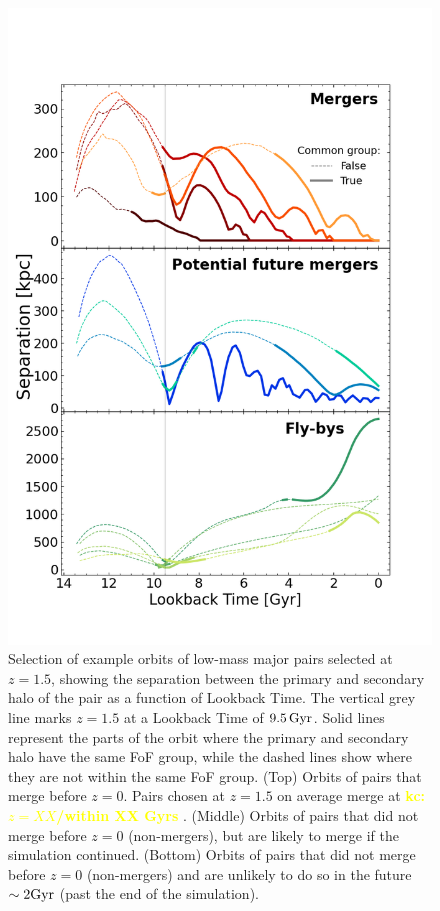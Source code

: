 \documentclass[twocolumn]{aastex631}
\newcommand{\kc}[1]{\textcolor{yellow}{\textbf{kc: #1}} }
\begin{document}
\begin{figure}[htb]
    \begin{center}
    \includegraphics[width=\columnwidth, trim={0.4cm 1.75cm 1cm 3.5cm}, clip]{plots/bet-on-it/5_exampleorbits.png}
    \caption{Selection of example orbits of low-mass major pairs selected at $z=1.5$, showing the separation between the primary and secondary halo of the pair as a function of Lookback Time. The vertical grey line marks $z=1.5$ at a Lookback Time of $9.5\,\mathrm{Gyr}$.
    Solid lines represent the parts of the orbit where the primary and secondary halo have the same FoF group, while the dashed lines show where they are not within the same FoF group. 
    (Top) Orbits of pairs that merge before $z=0$. Pairs chosen at $z=1.5$ on average merge at \kc{$z=XX$/within XX Gyrs}.
    (Middle) Orbits of pairs that did not merge before $z=0$ (non-mergers), but are likely to merge if the simulation continued. 
    (Bottom) Orbits of pairs that did not merge before $z=0$ (non-mergers) and are unlikely to do so in the future $\sim2\mathrm{Gyr}$ (past the end of the simulation). 
    }
    \label{fig:example-orbits}
    \end{center}
\end{figure}
\end{document}
